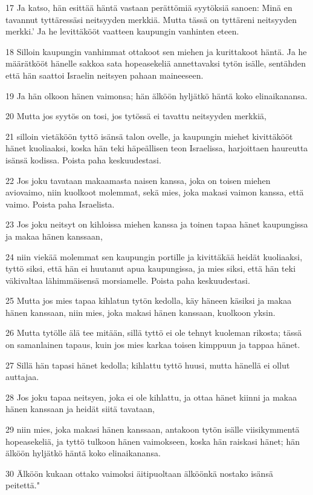\par 17 Ja katso, hän esittää häntä vastaan perättömiä syytöksiä sanoen: Minä en tavannut tyttäressäsi neitsyyden merkkiä. Mutta tässä on tyttäreni neitsyyden merkki.' Ja he levittäkööt vaatteen kaupungin vanhinten eteen.
\par 18 Silloin kaupungin vanhimmat ottakoot sen miehen ja kurittakoot häntä. Ja he määrätkööt hänelle sakkoa sata hopeasekeliä annettavaksi tytön isälle, sentähden että hän saattoi Israelin neitsyen pahaan maineeseen.
\par 19 Ja hän olkoon hänen vaimonsa; hän älköön hyljätkö häntä koko elinaikanansa.
\par 20 Mutta jos syytös on tosi, jos tytössä ei tavattu neitsyyden merkkiä,
\par 21 silloin vietäköön tyttö isänsä talon ovelle, ja kaupungin miehet kivittäkööt hänet kuoliaaksi, koska hän teki häpeällisen teon Israelissa, harjoittaen haureutta isänsä kodissa. Poista paha keskuudestasi.
\par 22 Jos joku tavataan makaamasta naisen kanssa, joka on toisen miehen aviovaimo, niin kuolkoot molemmat, sekä mies, joka makasi vaimon kanssa, että vaimo. Poista paha Israelista.
\par 23 Jos joku neitsyt on kihloissa miehen kanssa ja toinen tapaa hänet kaupungissa ja makaa hänen kanssaan,
\par 24 niin viekää molemmat sen kaupungin portille ja kivittäkää heidät kuoliaaksi, tyttö siksi, että hän ei huutanut apua kaupungissa, ja mies siksi, että hän teki väkivaltaa lähimmäisensä morsiamelle. Poista paha keskuudestasi.
\par 25 Mutta jos mies tapaa kihlatun tytön kedolla, käy häneen käsiksi ja makaa hänen kanssaan, niin mies, joka makasi hänen kanssaan, kuolkoon yksin.
\par 26 Mutta tytölle älä tee mitään, sillä tyttö ei ole tehnyt kuoleman rikosta; tässä on samanlainen tapaus, kuin jos mies karkaa toisen kimppuun ja tappaa hänet.
\par 27 Sillä hän tapasi hänet kedolla; kihlattu tyttö huusi, mutta hänellä ei ollut auttajaa.
\par 28 Jos joku tapaa neitsyen, joka ei ole kihlattu, ja ottaa hänet kiinni ja makaa hänen kanssaan ja heidät siitä tavataan,
\par 29 niin mies, joka makasi hänen kanssaan, antakoon tytön isälle viisikymmentä hopeasekeliä, ja tyttö tulkoon hänen vaimokseen, koska hän raiskasi hänet; hän älköön hyljätkö häntä koko elinaikanansa.
\par 30 Älköön kukaan ottako vaimoksi äitipuoltaan älköönkä nostako isänsä peitettä."

